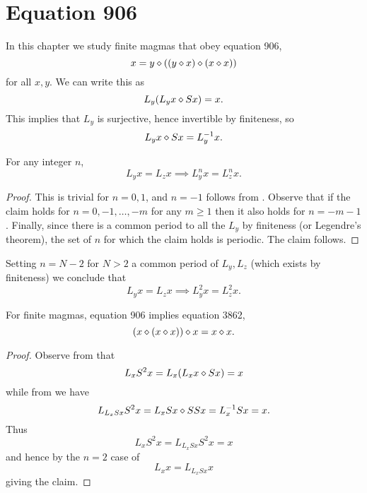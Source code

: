 \chapter{Equation 906}\label{906-chapter}

In this chapter we study finite magmas that obey equation 906,
\begin{equation}\label{906}
  x = y \diamond ((y \diamond x) \diamond (x \diamond x))
\end{equation}
for all $x,y$.  We can write this as
\begin{equation}\label{906-a}
  L_y (L_y x \diamond Sx) = x.
\end{equation}
This implies that $L_y$ is surjective, hence invertible by finiteness, so
\begin{equation}\label{906-b}
   L_y x \diamond Sx = L_y^{-1} x.
\end{equation}

\begin{corollary}\label{edge-disjoint}  For any integer $n$,
$$ L_y x = L_z x \implies L_y^{n} x = L_z^{n} x.$$
\end{corollary}

\begin{proof}  This is trivial for $n=0,1$, and $n=-1$ follows from .  Observe that if the claim holds for $n=0,-1,\dots,-m$ for any $m \geq 1$ then it also holds for $n=-m-1$.  Finally, since there is a common period to all the $L_y$ by finiteness (or Legendre's theorem), the set of $n$ for which the claim holds is periodic.  The claim follows.
\end{proof}
Setting $n = N-2$ for $N>2$ a common period of $L_y,L_z$ (which exists by finiteness) we conclude that
\begin{equation}\label{lyzx}
  L_y x = L_z x \implies L_y^2 x = L_z^2 x.
\end{equation}

\begin{theorem}\label{906-3862}  \leanok For finite magmas, equation 906 implies
equation 3862,
\begin{equation}\label{3862}
    (x \diamond (x \diamond x)) \diamond x = x \diamond x.
\end{equation}
\end{theorem}

\begin{proof} \leanok Observe from  that
$$ L_x S^2 x = L_x (L_x x \diamond Sx) = x$$
while from  we have
$$ L_{L_x Sx} S^2 x = L_x Sx \diamond S S x = L_x^{-1} Sx = x.$$
Thus
$$ L_x S^2 x = L_{L_x Sx} S^2 x = x$$
and hence by the $n=2$ case of 
$$ L_x x = L_{L_x Sx} x$$
giving the claim.
\end{proof}
